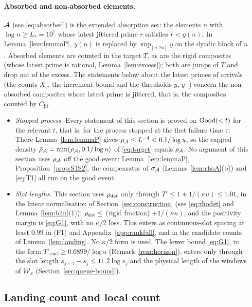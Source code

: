 \paragraph{Absorbed and non-absorbed elements.}
$\mathcal{A}$ (see \eqref{eq:absorbed}) is the extended absorption set: the elements $n$ with $\log n\ge L_*=10^7$ whose latest jittered
prime $r$ satisfies $r<y(n)$. In Lemma~\ref{lem:lemmaP}, $y(n)$ is replaced by $\sup_{[u,2u]}y$ on the dyadic block of
$n$. Absorbed elements are counted in the target $T$, as are the rigid composites (whose latest prime is rational, Lemma~\ref{lem:excess});
both are jumps of $T$ and drop out of the excess. The statements below about the latest primes of arrivals (the counts $X_q$, the
increment bound and the thresholds $y$, $y_-$) concern the non-absorbed composites whose latest prime is jittered, that is, the
composites counted by $C_{\mathrm{jit}}$.
\begin{itemize}
\item \emph{Stopped process.} Every statement of this section is proved on $\mathrm{Good}(<t)$ for the relevant $t$, that is, for the
  process stopped at the first failure time $\tau$. There Lemma~\ref{lem:lemmaP} gives $\rho_{\mathcal{A}}\le L^{-4}<0.1/\log u$, so the
  capped density $\bar\rho_{\mathcal{A}}=\min(\rho_{\mathcal{A}},0.1/\log u)$ of \eqref{eq:target} equals $\rho_{\mathcal{A}}$. No argument of this
  section uses $\rho_{\mathcal{A}}$ off the good event: Lemma~\ref{lem:lemmaP}, Proposition~\ref{prop:S1S2}, the compensator of
  $\sigma_{\mathcal{A}}$ (Lemma~\ref{lem:rhoA}(b)) and \eqref{eq:T1} all run on the good event.
\item \emph{Slot lengths.} This section uses $\rho_{\mathrm{det}}$ only through $T'\le1+1/(\kappa u)\le1.01$, in the linear
  normalisation of Section~\ref{sec:construction} (see \eqref{eq:rhodet} and Lemma~\ref{lem:blin}(1)): $\rho_{\mathrm{det}}\le$ (rigid fraction)
  $+1/(\kappa u)$, and the positivity margin is \eqref{eq:G1}, with no $\kappa/2$ loss. This enters as continuous-slot spacing at least
  $0.99$ in (F1) and Appendix~\ref{app:rankfull}, and in the candidate counts of Lemma~\ref{lem:landing}. No $\kappa/2$ form is used. The lower bound \eqref{eq:G1}, in the form
  $T'_{\mathrm{cont}}\ge0.0899/\log u$ (Remark~\ref{rem:horizon}), enters only through the slot length $s_{j+1}-s_j\le11.2\log s_j$
  and the physical length of the windows of $\mathcal W_x$ (Section~\ref{sec:queue-bound}).
\end{itemize}

\subsection{Landing count and local count}\label{sec:queue-landing}

